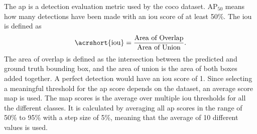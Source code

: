 The \gls{ap} is a detection evaluation metric used by the \gls{coco} dataset.
$\text{AP}_{50}$ means how many detections have been made with an \gls{iou} score of at least 50\%.
The \gls{iou} is defined as
\begin{equation}
	\text{\acrshort{iou}} = \frac{\text{Area of Overlap}}{\text{Area of Union}}.
\end{equation}
The area of overlap is defined as the intersection between the predicted and ground truth bounding box, and the area of union is the area of both boxes added together.
A perfect detection would have an \gls{iou} score of 1.
Since selecting a meaningful threshold for the \gls{ap} score depends on the dataset, an average score \gls{map} is used.
The \gls{map} scores is the average over multiple \gls{iou} thresholds for all the different classes.
It is calculated by averaging all \gls{ap} scores in the range of 50\% to 95\% with a step size of 5\%, meaning that the average of 10 different values is used.


